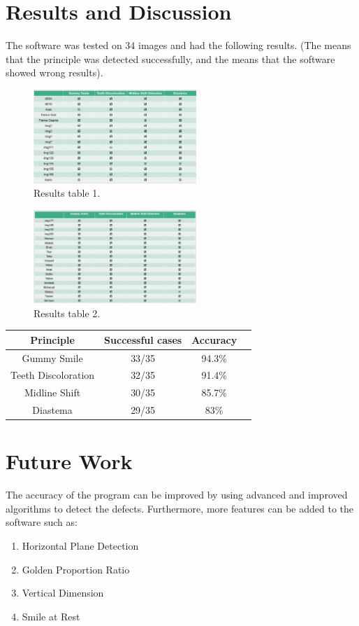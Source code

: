 \documentclass[conference,twocolumn]{IEEEtran}
\begin{document}
\section{Results and Discussion}
The software was tested on 34 images and had the following results. (The \checkmark means that the principle was detected successfully, and the  means that the software showed wrong results).

\begin{figure}[H]
    \centering
    \includegraphics[width=0.55\textwidth]{Screenshot_1.png}
    \caption{Results table 1.}
    \label{fig:my_label}
\end{figure}
\begin{figure}[H]
    \centering
    \includegraphics[width=0.55\textwidth]{Screenshot_2.png}
    \caption{Results table 2.}
    \label{fig:my_label}
\end{figure}
\begin{center}
\begin{tabular}{||c c c c||} 
 \hline
 Principle & Successful cases & Accuracy \\ [0.5ex] 
 \hline\hline
 Gummy Smile & 33/35 & 94.3\% \\
 \hline
 Teeth Discoloration & 32/35 & 91.4\% \\
 \hline
 Midline Shift & 30/35 & 85.7\% \\
 \hline
 Diastema & 29/35 & 83\%\\ [1ex] 
\hline
\end{tabular}
\end{center}
\section{Future Work}
The accuracy of the program can be improved by using advanced and improved algorithms to detect the defects. Furthermore, more features can be added to the software such as:
\begin{enumerate}
    \item Horizontal Plane Detection
    \item Golden Proportion Ratio
    \item Vertical Dimension 
    \item Smile at Rest
\end{enumerate}
\end{document}
